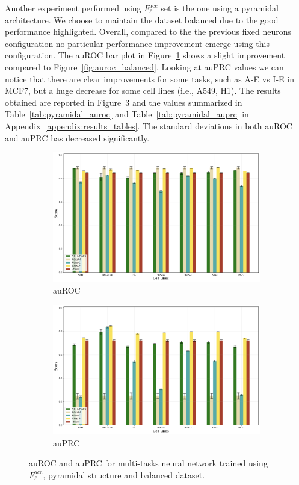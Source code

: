 Another experiment performed using $F_\ell^{\textrm{acc}}$ set is the one using a pyramidal architecture. We choose to maintain the dataset balanced due to the good performance highlighted. Overall, compared to the the previous fixed neurons configuration no particular performance improvement emerge using this configuration. The auROC bar plot in Figure~\ref{fig:auroc_pyramydal} shows a slight improvement compared to Figure~\ref{fig:auroc_balanced}. Looking at auPRC values we can notice that there are clear improvements for some tasks, such as A-E vs I-E in MCF7, but a huge decrease for some cell lines (i.e., A549, H1). The results obtained are reported in Figure~\ref{fig:pyramydal_results} and the values summarized in Table~\ref{tab:pyramidal_auroc} and Table~\ref{tab:pyramidal_auprc} in Appendix~\ref{appendix:results_tables}. The standard deviations in both auROC and auPRC has decreased significantly.  
\begin{figure}[!htbp]
    \centering
    \begin{subfigure}[b]{\textwidth}
        \includegraphics[width=\textwidth]{images/results_plots/pyramydal_auroc.png}
        \caption{auROC}
        \label{fig:auroc_pyramydal}
    \end{subfigure}
    \begin{subfigure}[b]{\textwidth}
        \includegraphics[width=\textwidth]{images/results_plots/pyramydal_auprc.png}
        \caption{auPRC}
        \label{fig:auprc_pyramydal}
    \end{subfigure}
    \caption{auROC and auPRC for multi-tasks neural network trained using $F_\ell^{\textrm{acc}}$, pyramidal structure and balanced dataset.}\label{fig:pyramydal_results}
\end{figure}
